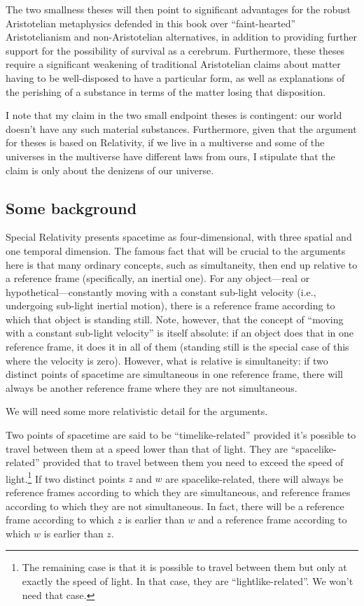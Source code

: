The two smallness theses will then point to significant advantages for the robust Aristotelian metaphysics defended 
in this book over ``faint-hearted'' Aristotelianism and non-Aristotelian alternatives, in addition to providing
further support for the possibility of survival as a cerebrum. Furthermore, these theses require a significant 
weakening of traditional Aristotelian claims about matter having to be well-disposed to have a particular form, 
as well as explanations of the perishing of a substance in terms of the matter losing that disposition. 

I note that my claim in the two small endpoint theses is contingent: our world doesn't have any such material substances.
Furthermore, given that the argument for theses is based on Relativity, if we live in a multiverse and some of the
universes in the multiverse have different laws from ours, I stipulate that the claim is only about the denizens of 
our universe.

\subsection{Some background}
Special Relativity presents spacetime as four-dimensional, with three spatial and one temporal dimension.
The famous fact that will be crucial to the arguments here is that many ordinary concepts, such as simultaneity,
then end up relative to a reference frame (specifically, an inertial one). For any object---real or hypothetical---constantly 
moving with a constant sub-light velocity (i.e., undergoing sub-light inertial motion), there is a reference frame according 
to which that object 
is standing still. Note, however, that the concept of ``moving with a constant sub-light velocity'' is itself absolute: 
if an object does that in one reference frame, it does it in all of them (standing still is the special case of this where
the velocity is zero). However, what is relative is simultaneity: if two distinct points of spacetime are simultaneous in one 
reference frame, there will always be another reference frame where they are not simultaneous. 

We will need some more relativistic detail for the arguments. 

Two points of spacetime are said to be ``timelike-related'' provided it's possible to travel between them 
at a speed lower than that of light. They are ``spacelike-related'' provided that to travel between them 
you need to exceed the speed of light.\footnote{The remaining case is that it is possible to travel between 
them but only at exactly the speed of light. In that case, they are ``lightlike-related''. We won't need that 
case.} If two distinct points $z$ and $w$ are spacelike-related, there will always be reference frames according to which they are 
simultaneous, and reference frames according to which they are not simultaneous. In fact, there will be a reference frame
according to which $z$ is earlier than $w$ and a reference frame according to which $w$ is earlier than $z$. 

